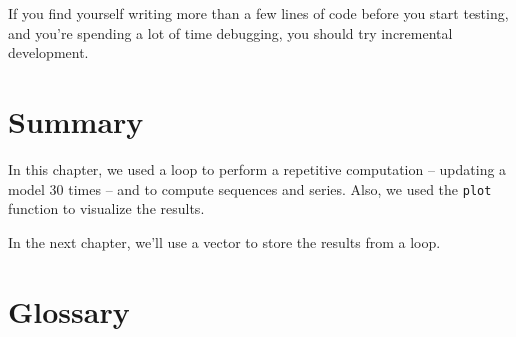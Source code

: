 If you find yourself writing more than a few lines of code before
you start testing, and you're spending a lot of time debugging,
you should try incremental development.




\section{Summary}

In this chapter, we used a loop to perform a repetitive computation -- updating a model 30 times -- and to compute sequences and series.  Also, we used the {\tt plot} function to visualize the results.

In the next chapter, we'll use a vector to store the results from a loop.



\section{Glossary}


